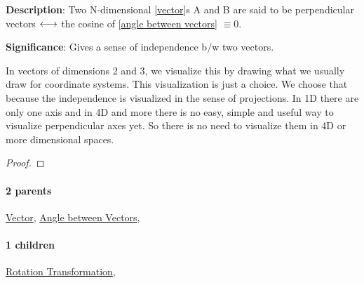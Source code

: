 \documentclass[../main.tex]{subfiles}
\begin{document}
\begin{statement}
\label{statement:Perpendicular Vectors}\hspace*{0pt}\par
\end{statement}
\textbf{Description}:
Two N-dimensional [\hyperref[statement:Vector]{vector}]s A and B are said to be perpendicular vectors $ \longleftrightarrow $ the cosine of [\hyperref[statement:Angle between Vectors]{angle between vectors}] $ \equiv 0 $.
\par
{\color{magenta} \textbf{Significance}:
Gives a sense of independence b/w two vectors.

In vectors of dimensions 2 and 3, we visualize this by drawing what we usually draw for coordinate systems.
This visualization is just a choice.
We choose that because the independence is visualized in the sense of projections.
In 1D there are only one axis and in 4D and more there is no easy, simple and useful way to visualize perpendicular axes yet.
So there is no need to visualize them in 4D or more dimensional spaces.
\par}
\begin{proof}
\proofbydefinition
\end{proof}\par
\paragraph{2 parents} \hyperref[statement:Vector]{Vector}, \hyperref[statement:Angle between Vectors]{Angle between Vectors}, 
\paragraph{1 children} \hyperref[statement:Rotation Transformation]{Rotation Transformation}, 
\end{document}
